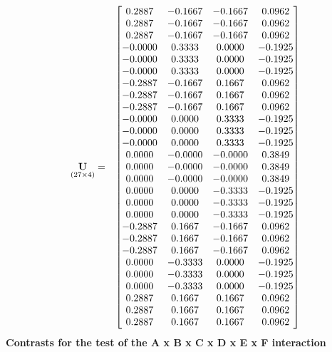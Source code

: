 \documentclass{glimmpse-report}
\begin{document}
\begin{eqnarray*}
\underset{\left(27\times4\right)}{\mathbf{U}} & = & \begin{bmatrix}0.2887 & -0.1667 & -0.1667 & 0.0962\protect\\
0.2887 & -0.1667 & -0.1667 & 0.0962\protect\\
0.2887 & -0.1667 & -0.1667 & 0.0962\protect\\
-0.0000 & 0.3333 & 0.0000 & -0.1925\protect\\
-0.0000 & 0.3333 & 0.0000 & -0.1925\protect\\
-0.0000 & 0.3333 & 0.0000 & -0.1925\protect\\
-0.2887 & -0.1667 & 0.1667 & 0.0962\protect\\
-0.2887 & -0.1667 & 0.1667 & 0.0962\protect\\
-0.2887 & -0.1667 & 0.1667 & 0.0962\protect\\
-0.0000 & 0.0000 & 0.3333 & -0.1925\protect\\
-0.0000 & 0.0000 & 0.3333 & -0.1925\protect\\
-0.0000 & 0.0000 & 0.3333 & -0.1925\protect\\
0.0000 & -0.0000 & -0.0000 & 0.3849\protect\\
0.0000 & -0.0000 & -0.0000 & 0.3849\protect\\
0.0000 & -0.0000 & -0.0000 & 0.3849\protect\\
0.0000 & 0.0000 & -0.3333 & -0.1925\protect\\
0.0000 & 0.0000 & -0.3333 & -0.1925\protect\\
0.0000 & 0.0000 & -0.3333 & -0.1925\protect\\
-0.2887 & 0.1667 & -0.1667 & 0.0962\protect\\
-0.2887 & 0.1667 & -0.1667 & 0.0962\protect\\
-0.2887 & 0.1667 & -0.1667 & 0.0962\protect\\
0.0000 & -0.3333 & 0.0000 & -0.1925\protect\\
0.0000 & -0.3333 & 0.0000 & -0.1925\protect\\
0.0000 & -0.3333 & 0.0000 & -0.1925\protect\\
0.2887 & 0.1667 & 0.1667 & 0.0962\protect\\
0.2887 & 0.1667 & 0.1667 & 0.0962\protect\\
0.2887 & 0.1667 & 0.1667 & 0.0962\protect\\
\end{bmatrix}
\end{eqnarray*}
\newpage\textbf{Contrasts for the test of the A x B x C x D x E x F interaction}
\end{document}
